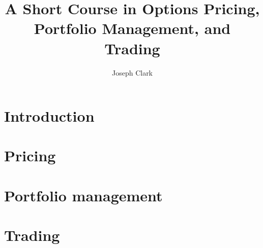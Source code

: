 \documentclass[a4paper,fleqn]{book}
\begin{document}
\frontmatter

\title{A Short Course in Options Pricing, Portfolio Management, and Trading}
\author{Joseph Clark}

\maketitle
\date{}

%

\setlength{\parskip}{0ex plus 0.5ex minus 0.2ex}
\tableofcontents

\setlength{\parskip}{1.3ex plus 0.2ex minus 0.2ex}

\mainmatter
\fancyhead[LO]{\leftmark}

\chapter{Introduction}

\chapter{Pricing}

\chapter{Portfolio management }

\chapter{Trading}


\newpage
\pagestyle{plain}


\newpage
\end{document}
